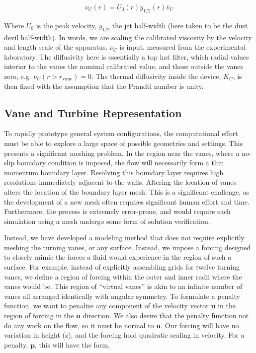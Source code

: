 \begin{equation}
 \nu_C(r) = U_0(r) y_{1/2}(r) \bar \nu_C
\end{equation}

Where $U_0$ is the peak velocity, $y_{1/2}$ the jet half-width (here
taken to be the dust devil half-width). In words, we are scaling the
calibrated viscosity by the velocity and length scale of the
apparatus. $\bar \nu_C $ is input, measured from the experimental
laboratory.  The diffusivity here is essentially a top hat filter, which
radial values interior to the vanes the nominal calibrated value, and
those outside the vanes zero, e.g. $\nu_C(r>r_{\text{vane}})=0$. The
thermal diffusivity inside the device, $K_C$, is then fixed with the
assumption that the Prandtl number is unity.  

\subsection{Vane and Turbine Representation}

To rapidly prototype general system configurations, the
computational effort must be able to explore a large space of possible
geometries and settings. This presents a significant meshing
problem. In the region near the vanes, where a no-slip boundary
condition is imposed, the flow will necessarily form a thin momentum
boundary layer. Resolving this boundary layer requires high resolutions
immediately adjacent to the walls. Altering the location of vanes
alters the location of the boundary layer mesh. This is a significant
challenge, as the development of a new mesh often requires significant
human effort and time. Furthermore, the process is extremely
error-prone, and would require each simulation using a mesh undergo
some form of solution verification. 

Instead, we have developed a modeling method that does not require
explicitly meshing the turning vanes, or any surface. Instead, we impose
a forcing designed to closely mimic the forces a fluid would experience
in the region of such a surface. For example, instead of explicitly
assembling grids for twelve turning vanes, we define a region of forcing
within the 
outer and inner radii where the vanes would be. This region of ``virtual
vanes'' is akin to an infinite number of vanes all arranged identically
with angular symmetry. To formulate a penalty function, we want to
penalize any component of the velocity vector $\textbf{u}$ in the region
of forcing in the \textbf{n} direction. We also desire that the penalty
function not do any work on the flow, so it must be normal to
\textbf{u}. Our forcing will have no variation in height (z), and the
forcing hold quadratic scaling in velocity. For a penalty,
$\textbf{p}$, this will have the form,   

